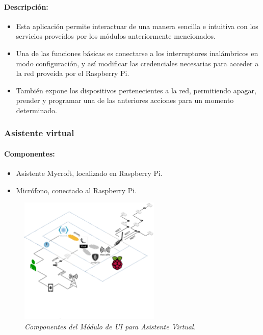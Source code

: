 \paragraph{Descripción:}

\begin{itemize}

\item Esta aplicación permite interactuar de una manera sencilla e intuitiva con los servicios proveídos por los módulos anteriormente mencionados.

\item Una de las funciones básicas es conectarse a los interruptores inalámbricos en modo configuración, y así modificar las credenciales necesarias para acceder a la red proveída por el Raspberry Pi.

\item También expone los dispositivos pertenecientes a la red, permitiendo apagar, prender y programar una de las anteriores acciones para un momento determinado.

\end{itemize}


\subsubsection{Asistente virtual}

\paragraph{Componentes:}

\begin{itemize}

\item Asistente Mycroft, localizado en Raspberry Pi.

\item Micrófono, conectado al Raspberry Pi.

\end{itemize}

\begin{figure}[h]
  \centering
  \includegraphics[width=0.6\textwidth, keepaspectratio]{images/mod-ui-mycroft}
  \caption{\textit{Componentes del Módulo de UI para Asistente Virtual.}}
  \label{fig:mod-ui-mycroft}
\end{figure}

